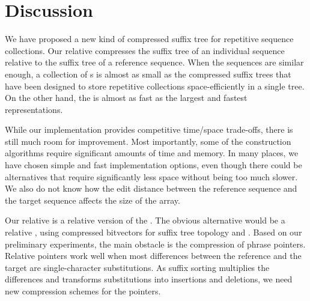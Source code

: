 
\section{Discussion}\label{section:discussion}

We have proposed a new kind of compressed suffix tree for repetitive sequence collections. Our relative \CST{} compresses the suffix tree of an individual sequence relative to the suffix tree of a reference sequence. When the sequences are similar enough, a collection of \RCST{}s is almost as small as the compressed suffix trees that have been designed to store repetitive collections space-efficiently in a single tree. On the other hand, the \RCST{} is almost as fast as the largest and fastest \CST{} representations.

While our \RCST{} implementation provides competitive time/space trade-offs, there is still much room for improvement. Most importantly, some of the construction algorithms require significant amounts of time and memory. In many places, we have chosen simple and fast implementation options, even though there could be alternatives that require significantly less space without being too much slower. We also do not know how the edit distance between the reference sequence and the target sequence affects the size of the \RLCP{} array.

Our relative \CST{} is a relative version of the \CSTnpr. The obvious alternative would be a relative \CSTsada, using \RLZ{} compressed bitvectors for suffix tree topology and \PLCP. Based on our preliminary experiments, the main obstacle is the compression of phrase pointers. Relative pointers work well when most differences between the reference and the target are single-character substitutions. As suffix sorting multiplies the differences and transforms substitutions into insertions and deletions, we need new compression schemes for the pointers.
